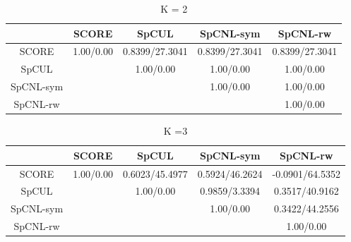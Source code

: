 \documentclass{article}
\numberwithin{equation}{section}
\begin{document}
\begin{table}\caption{K = 2}
	\centering
	\begin{tabular}{|c|c|c|c|c|}
		\hline
		& SCORE & SpCUL & SpCNL-sym & SpCNL-rw \\\hline
		SCORE & 1.00/0.00 & 0.8399/27.3041 & 0.8399/27.3041 & 0.8399/27.3041 \\\hline
		SpCUL &  & 1.00/0.00 & 1.00/0.00 & 1.00/0.00 \\\hline
		SpCNL-sym &  &  & 1.00/0.00  & 1.00/0.00 \\\hline
		SpCNL-rw &  &  &  & 1.00/0.00 \\\hline
	\end{tabular}
\end{table}

\begin{table}\caption{K =3}
	\centering
	\begin{tabular}{|c|c|c|c|c|}
		\hline
		& SCORE & SpCUL & SpCNL-sym & SpCNL-rw \\\hline
		SCORE & 1.00/0.00 & 0.6023/45.4977 & 0.5924/46.2624 & -0.0901/64.5352 \\\hline
		SpCUL &  & 1.00/0.00 & 0.9859/3.3394 & 0.3517/40.9162 \\\hline
		SpCNL-sym &  &  & 1.00/0.00  & 0.3422/44.2556 \\\hline
		SpCNL-rw &  &  &  & 1.00/0.00 \\\hline
	\end{tabular}
\end{table}
\end{document}
